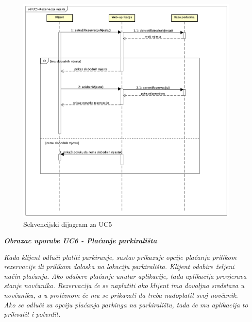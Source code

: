 				   \pagebreak
				   
				   
				   
				   
				    \begin{figure}[hbt!]
				    	\centering
				    	\includegraphics[width=0.7\linewidth]{slike/mjesto.png}
				    	\caption{Sekvencijski dijagram za UC5}
				    	\label{fig:mjesto}
				    \end{figure}
				    
				    
				    
				    
				    
				    
				    
				    
				    
				    
			     	
				    \textbf{\textit{Obrazac uporabe UC6 - Plaćanje parkirališta}}
				    				
				     \textit{Kada klijent odluči platiti parkiranje, sustav prikazuje opcije plaćanja prilikom rezervacije ili prilikom dolaska na lokaciju parkirališta. Klijent odabire željeni način plaćanja. Ako odabere plaćanje unutar aplikacije, tada aplikacija provjerava stanje novčanika. Rezervacija će se naplatiti ako klijent ima dovoljno sredstava u novčaniku, a u protivnom će mu se prikazati da treba nadoplatit svoj novčanik. Ako se odluči za opciju plaćanja parkinga na parkiralištu, tada će mu aplikacija to prihvatit i potvrdit.}
				     
				     
				     
